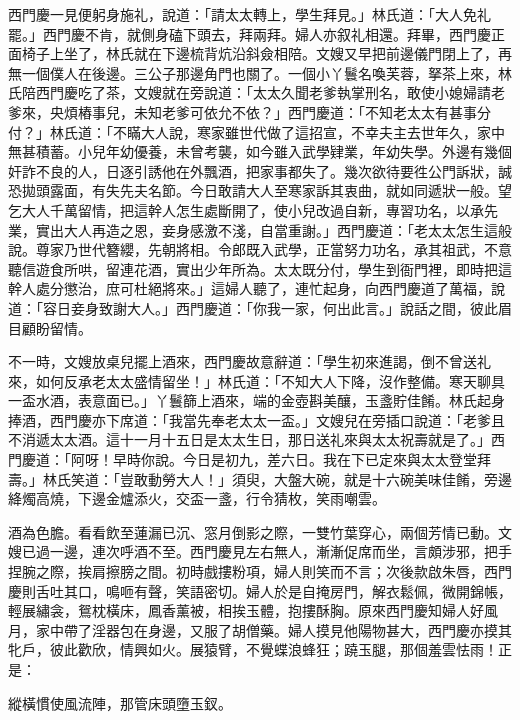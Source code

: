 西門慶一見便躬身施礼，說道：「請太太轉上，學生拜見。」林氏道：「大人免礼罷。」西門慶不肯，就側身磕下頭去，拜兩拜。婦人亦叙礼相還。拜畢，西門慶正面椅子上坐了，林氏就在下邊梳背炕沿斜僉相陪。文嫂又早把前邊儀門閉上了，再無一個僕人在後邊。三公子那邊角門也關了。一個小丫鬟名喚芙蓉，拏茶上來，林氏陪西門慶吃了茶，文嫂就在旁說道：「太太久聞老爹執掌刑名，敢使小媳婦請老爹來，央煩樁事兒，未知老爹可依允不依？」{}西門慶道：「不知老太太有甚事分付？」林氏道：「不瞞大人說，寒家雖世代做了這招宣，不幸夫主去世年久，家中無甚積蓄。小兒年幼優養，未曾考襲，如今雖入武學肄業，年幼失學。外邊有幾個奸詐不良的人，日逐引誘他在外飄酒，把家事都失了。幾次欲待要徃公門訴狀，誠恐拋頭露面，有失先夫名節。{}今日敢請大人至寒家訴其衷曲，就如同遞狀一般。望乞大人千萬留情，把這幹人怎生處斷開了，使小兒改過自新，專習功名，以承先業，實出大人再造之恩，妾身感激不淺，自當重謝。」西門慶道：「老太太怎生這般說。尊家乃世代簪纓，先朝將相。令郎既入武學，正當努力功名，承其祖武，不意聽信遊食所哄，留連花酒，實出少年所為。太太既分付，學生到衙門裡，即時把這幹人處分懲治，庶可杜絕將來。」這婦人聽了，連忙起身，向西門慶道了萬福，說道：「容日妾身致謝大人。」西門慶道：「你我一家，何出此言。」說話之間，彼此眉目顧盼留情。

不一時，文嫂放桌兒擺上酒來，西門慶故意辭道：{}「學生初來進謁，倒不曾送礼來，如何反承老太太盛情留坐！」林氏道：「不知大人下降，沒作整備。寒天聊具一盃水酒，表意面已。」丫鬟篩上酒來，端的金壺斟美釀，玉盞貯佳餚。林氏起身捧酒，西門慶亦下席道：「我當先奉老太太一盃。」文嫂兒在旁插口說道：「老爹且不消遞太太酒。這十一月十五日是太太生日，那日送礼來與太太祝壽就是了。」西門慶道：「阿呀！早時你說。今日是初九，差六日。我在下已定來與太太登堂拜壽。」林氏笑道：「豈敢動勞大人！」須臾，大盤大碗，就是十六碗美味佳餚，旁邊絳燭高燒，下邊金爐添火，交盃一盞，行令猜枚，笑雨嘲雲。

酒為色膽。看看飲至蓮漏已沉、窓月倒影之際，一雙竹葉穿心，兩個芳情已動。文嫂已過一邊，連次呼酒不至。西門慶見左右無人，漸漸促席而坐，言頗涉邪，把手捏腕之際，挨肩擦膀之間。初時戲摟粉項，婦人則笑而不言；次後款啟朱唇，西門慶則舌吐其口，鳴咂有聲，笑語密切。{}婦人於是自掩房門，解衣鬆佩，微開錦帳，輕展繡衾，鴛枕橫床，鳳香薰被，相挨玉體，抱摟酥胸。原來西門慶知婦人好風月，家中帶了淫器包在身邊，又服了胡僧藥。婦人摸見他陽物甚大，西門慶亦摸其牝戶，彼此歡欣，情興如火。展猿臂，不覺蝶浪蜂狂；蹺玉腿，那個羞雲怯雨！正是：

\begin{myquote} 
縱橫慣使風流陣，那管床頭墮玉釵。
\end{myquote} 

